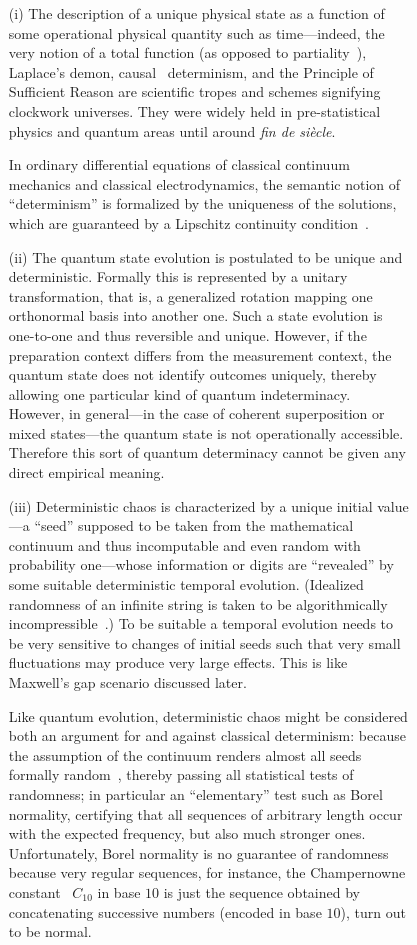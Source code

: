 \documentclass[entropy,article,accept,oneauthor,pdftex]{Definitions/mdpi}
\begin{document}
\begin{figure}[H]
\begin{itemize}

\item[(i)]
The description of a unique physical state as a function of some operational physical quantity such as time---indeed, the very notion of a total function
(as opposed to partiality~\cite{Kleene1936}),
Laplace's demon, causal~\cite{Norton-2003-cafs} determinism,
and the Principle of Sufficient Reason are scientific tropes and schemes
signifying clockwork universes.
They were widely held in pre-statistical physics and quantum areas until around {\it fin de si\`ecle}.

In ordinary differential equations of
classical continuum mechanics and classical electrodynamics,
the semantic notion of ``determinism''
is formalized by the uniqueness of the solutions, which
are guaranteed by a Lipschitz continuity
condition~\cite[Chapter~17]{svozil-pac}.


\item[(ii)]
The quantum state evolution is postulated to be unique and deterministic.
Formally this is represented by a unitary transformation, that is,
a generalized rotation mapping one orthonormal basis into another one.
Such a state evolution is one-to-one and thus reversible and unique.
However, if the preparation context differs from the measurement context,
the quantum state does not identify outcomes uniquely,
thereby allowing one particular kind of quantum indeterminacy.
However, in general---in the case of coherent superposition or mixed states---the
quantum state is not operationally accessible.
Therefore this sort of
quantum determinacy cannot be given any direct empirical meaning.

\item[(iii)]
Deterministic chaos is characterized by a unique initial value---a ``seed''
supposed to be taken from the mathematical continuum and thus
incomputable and even random
with probability one---whose information or digits are ``revealed''
by some suitable deterministic temporal evolution.
(Idealized randomness of an infinite string
is taken to be algorithmically incompressible~\cite{martin-lof}.)
To be suitable a temporal evolution needs to be very sensitive to changes of
initial seeds such that very small
fluctuations may produce very large effects.
This is like Maxwell's gap scenario discussed later.

Like quantum evolution, deterministic chaos might be considered both an argument
for and against classical determinism: because
the assumption of the continuum renders almost all seeds formally random~\cite{martin-lof},
thereby passing all statistical tests of randomness; in particular an ``elementary'' test such as
Borel normality, certifying that all sequences of arbitrary length occur
with the expected frequency, but also much stronger ones.
Unfortunately,
Borel normality is no guarantee of randomness because very regular sequences,
for instance,
the Champernowne constant~\cite{Sloane_oeis.org/A033307} $C_{10}$ in base $10$
is just the sequence obtained by concatenating
successive numbers (encoded in base $10$),
turn out to be normal.


\end{itemize}
\end{figure}
\end{document}
